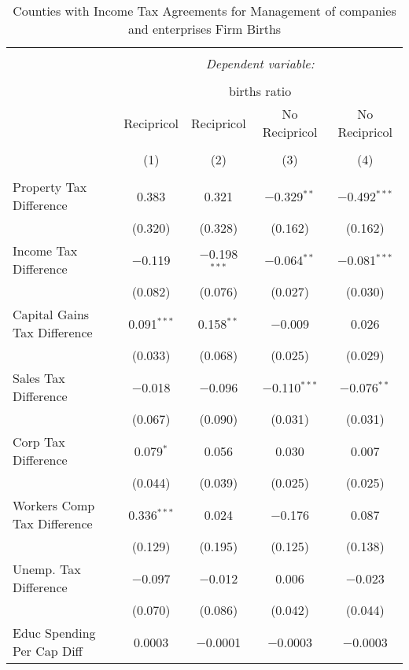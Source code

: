 
\begin{table}[!htbp] \centering 
  \caption{Counties with Income Tax Agreements for  Management of companies and enterprises Firm Births} 
  \label{55rd} 
\begin{tabular}{@{\extracolsep{5pt}}lcccc} 
\\[-1.8ex]\hline 
\hline \\[-1.8ex] 
 & \multicolumn{4}{c}{\textit{Dependent variable:}} \\ 
\cline{2-5} 
\\[-1.8ex] & \multicolumn{4}{c}{births ratio} \\ 
 & Recipricol & Recipricol & No Recipricol & No Recipricol \\ 
\\[-1.8ex] & (1) & (2) & (3) & (4)\\ 
\hline \\[-1.8ex] 
 Property Tax Difference & 0.383 & 0.321 & $-$0.329$^{**}$ & $-$0.492$^{***}$ \\ 
  & (0.320) & (0.328) & (0.162) & (0.162) \\ 
  Income Tax Difference & $-$0.119 & $-$0.198$^{***}$ & $-$0.064$^{**}$ & $-$0.081$^{***}$ \\ 
  & (0.082) & (0.076) & (0.027) & (0.030) \\ 
  Capital Gains Tax Difference & 0.091$^{***}$ & 0.158$^{**}$ & $-$0.009 & 0.026 \\ 
  & (0.033) & (0.068) & (0.025) & (0.029) \\ 
  Sales Tax Difference & $-$0.018 & $-$0.096 & $-$0.110$^{***}$ & $-$0.076$^{**}$ \\ 
  & (0.067) & (0.090) & (0.031) & (0.031) \\ 
  Corp Tax Difference & 0.079$^{*}$ & 0.056 & 0.030 & 0.007 \\ 
  & (0.044) & (0.039) & (0.025) & (0.025) \\ 
  Workers Comp Tax Difference & 0.336$^{***}$ & 0.024 & $-$0.176 & 0.087 \\ 
  & (0.129) & (0.195) & (0.125) & (0.138) \\ 
  Unemp. Tax Difference & $-$0.097 & $-$0.012 & 0.006 & $-$0.023 \\ 
  & (0.070) & (0.086) & (0.042) & (0.044) \\ 
  Educ Spending Per Cap Diff & 0.0003 & $-$0.0001 & $-$0.0003 & $-$0.0003 \\ 

\end{tabular}
\end{table}
